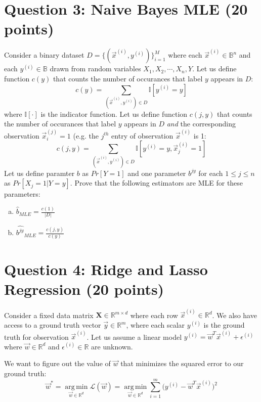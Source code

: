 \documentclass[11pt]{article}
\newcommand{\question}[1]{\section*{\normalsize #1}}
\DeclareMathOperator*{\argmin}{arg\,min}
\begin{document}
\question{Question 3: Naive Bayes MLE (20 points)}
Consider a binary dataset $D = \{(\vec{x}^{(i)}, y^{(i)})\}_{i=1}^M$ where each $\vec{x}^{(i)}\in\mathbb{B}^{n}$ and each $y^{(i)}\in\mathbb{B}$ drawn from random variables $X_1, X_2, \cdots, X_n, Y$. Let us define function $c(y)$ that counts the number of occurances that label $y$ appears in $D$:
$$c(y) = \sum\limits_{(\vec{x}^{(i)}, y^{(i)})\in D} \mathbb{I}[y^{(i)}=y]$$
where $\mathbb{I}[\cdot]$ is the indicator function. Let us define function $c(j,y)$ that counts the number of occurances that label $y$ appears in $D$ \textit{and} the corresponding observation $\vec{x}^{(j)}_i = 1$ (e.g. the $j^{th}$ entry of observation $\vec{x}^{(i)}$ is 1:
$$c(j,y) = \sum\limits_{(\vec{x}^{(i)}, y^{(i)})\in D} \mathbb{I}[y^{(i)}=y, \vec{x}^{(i)}_j=1]$$
Let us define paramter $b$ as $Pr[Y=1]$ and one parameter $b^{jy}$ for each $1\le j\le n$ as $Pr[X_j=1|Y=y]$. Prove that the following estimators are MLE for these parameters:
\begin{enumerate}[(a)]
    \item $\hat{b}_{MLE} = \frac{c(1)}{|D|}$
    \item $\hat{b^{jy}}_{MLE} = \frac{c(j,y)}{c(y)}$
\end{enumerate}\newpage















\question{Question 4: Ridge and Lasso Regression (20 points)}
Consider a fixed data matrix $\textbf{X}\in \mathbb{R}^{m\times d}$ where each row $\vec{x}^{(i)}\in \mathbb{R}^{d}$. We also have access to a ground truth vector $\vec{y}\in\mathbb{R}^{m}$, where each scalar $y^{(i)}$ is the ground truth for observation $\vec{x}^{(i)}$. Let us assume a linear model $y^{(i)} = \vec{w}^T\vec{x}^{(i)} + \epsilon^{(i)}$ where $\vec{w}\in \mathbb{R}^{d}$ and $\epsilon^{(i)}\in \mathbb{R}$ are unknown.\newline

\noindent We want to figure out the value of $\vec{w}$ that minimizes the squared error to our ground truth:
$$\vec{w}^* = \argmin\limits_{\vec{w}\in \mathbb{R}^d} \mathcal{L}(\vec{w}) = \argmin\limits_{\vec{w}\in \mathbb{R}^d} \sum\limits_{i=1}^m \Big(y^{(i)} - \vec{w}^T\vec{x}^{(i)}\Big)^2$$
\end{document}
